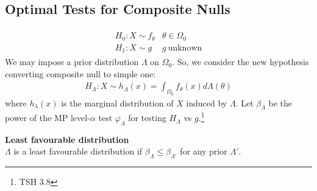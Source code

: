 \subsection{Optimal Tests for Composite Nulls}

\begin{gather}\begin{array}{ll}
    H_0:X\sim f_\theta & \theta\in\Omega_0 \\
    H_1:X\sim g & g~\text{unknown}
\end{array}\end{gather}
We may impose a prior distribution $\Lambda$ on $\Omega_0$.
So, we consider the new hypothesis converting composite null to simple one:
\begin{gather}
    H_\Lambda:X\sim h_\Lambda(x)=\int_{\Omega_0}f_\theta(x)d\Lambda(\theta)
\end{gather}
where $h_\lambda(x)$ is the marginal distribution of $X$ induced by $\Lambda$.
Let $\beta_\Lambda$ be the power of the MP level-$\alpha$ test $\varphi_\Lambda$ for testing $H_\Lambda$ vs $g$.\footnote{
TSH 3.8
}

\begin{definition}
    \textbf{Least favourable distribution}\\
    $\Lambda$ is a least favourable distribution if $\beta_\Lambda\leq\beta_{\Lambda'}$ for any prior $\Lambda'$.
\end{definition}

